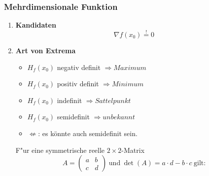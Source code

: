 \documentclass[8pt, a4paper, landscape, fleqn]{scrartcl}
\begin{document}
\begin{multicols*}{3}
				\subsubsection{Mehrdimensionale Funktion}
					\begin{enumerate}
						\item \textbf{Kandidaten}
						\begin{equation*}
							\nabla f(x_0)\overset{!}{=}0
						\end{equation*}
						\item \textbf{Art von Extrema}
							\begin{itemize}
								\item $H_f(x_0)$ negativ definit $\Rightarrow Maximum$
								\item $H_f(x_0)$ positiv definit $\Rightarrow Minimum$
								\item $H_f(x_0)$ indefinit $\Rightarrow Sattelpunkt$
								\item $H_f(x_0)$ semidefinit $\Rightarrow unbekannt$
								\item$\not \Leftarrow$: es könnte auch semidefinit sein.
							\end{itemize}
							
						\vspace{8pt}
						F"ur eine symmetrische reelle \(2\times2\)-Matrix
						\vspace{-4pt}
						\begin{equation*}
						    A =
						    \begin{pmatrix}
							    a&b\\c&d
						    \end{pmatrix}
						    \hspace{3pt}  \text{und} \hspace{3pt}\det(A) = a\cdot d - b\cdot c \hspace{3pt} \text{gilt:}
					    \end{equation*}
					    \vspace{-15pt}
						

\end{enumerate}
\end{multicols*}
\end{document}

